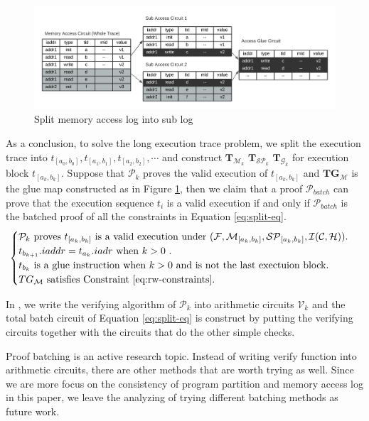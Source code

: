 \begin{figure}[!ht]
\centerline{
\includegraphics[scale=0.6]{figs/memory-glue.png}
}
\caption{Split memory access log into sub log}
\label{fig:tbl-glue}
\end{figure}

\smallskip As a conclusion, to solve the long execution trace problem, we split the execution trace into $t_{[a_0,b_0]}, t_{[a_1,b_1]}, t_{[a_2, b_2]}, \cdots$ and construct $\mathbf{T}_{\mathcal{M}_{k}}$ $\mathbf{T}_{\mathcal{SP}_{k}}$ $\mathbf{T}_{\mathcal{G}_{k}}$ for execution block $t_{[a_k, b_k]}$. Suppose that $\mathcal{P}_k$ proves the valid execution of $t_{[a_k,b_k]}$ and $\mathbf{TG}_\mathcal{M}$ is the glue map constructed as in Figure \ref{fig:tbl-glue}, then we claim that a proof $\mathcal{P}_{batch}$ can prove that the execution sequence $t_i$ is a valid execution if and only if $\mathcal{P}_{batch}$ is the batched proof of all the constraints in Equation \ref{eq:split-eq}.
\begin{equation}
   \begin{cases}
        \mathcal{P}_k \textrm{ proves }  t_{[a_k,b_k]} \textrm{ is a valid execution under } (\mathcal{F}, \mathcal{M}_{[a_k,b_k]}, \mathcal{SP}_{[a_k,b_k]}, \mathcal{I}(\mathcal{C,\mathcal{H}})). \\
        t_{b_{k+1}}.iaddr = t_{a_{k}}.iadr \textrm{ when $k>0$ }. \\
        t_{b_{k}} \textrm{ is a glue instruction when $k>0$ and is not the last exectuion block}. \\
        TG_\mathcal{M} \textrm { satisfies Constraint \ref{eq:rw-constraints}}. \\
   \end{cases}
    \label{eq:split-eq}
\end{equation}

\noindent In \zkwasm, we write the verifying algorithm of $\mathcal{P}_k$ into arithmetic circuits $\mathcal{V}_k$ and the total batch circuit of Equation \ref{eq:split-eq} is construct by putting the verifying circuits together with the circuits that do the other simple checks.

\begin{remark}
Proof batching is an active research topic. Instead of writing verify function into arithmetic circuits, there are other methods \cite{ben2017scalable-batch,chiesa2019cycles-batch,habock2021darlin-batch,kothapalli2022nova-batch} that are worth trying as well. Since we are more focus on the consistency of program partition and memory access log in this paper, we leave the analyzing of trying different batching methods as future work.
\end{remark}